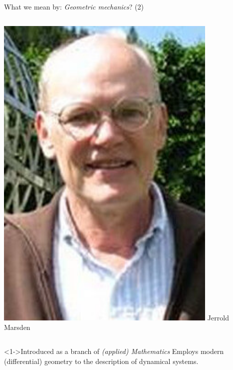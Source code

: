 \documentclass[handout,10pt]{beamer}
\begin{document}
\begin{frame}{What we mean by: \emph{Geometric mechanics}? (2)}
\begin{columns}[T]
\begin{column}{.2\textwidth}
			\includegraphics[width=0.8\textwidth]{Pictures/FFat/marsden} 
			Jerrold \\
			Marsden
		\end{column}		
	\end{columns}	

	\pause
	\vfill
	\begin{block}<1->{Introduced as a branch of \emph{(applied) Mathematics}}
			Employs modern (differential) geometry to the description of dynamical systems.	
	\end{block}


\end{frame}
\end{document}
